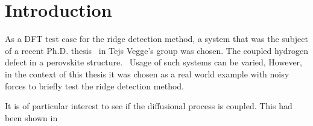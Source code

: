 \section{Introduction}
\label{sec:perovskites-introduction}

As a DFT test case for the ridge detection method, a system that was the subject of a recent Ph.D. thesis~\cite{nicolai-2010} in Tejs Vegge's group was chosen.
The coupled hydrogen defect in a  perovskite structure.~\cite{double-defect-2011}
Usage of such systems can be varied, \expand
However, in the context of this thesis it was chosen as a real world example with noisy forces to briefly test the ridge detection method.

It is of particular interest to see if the diffusional process is coupled.
This had been shown in \cite{double-defect-2011} \expand




